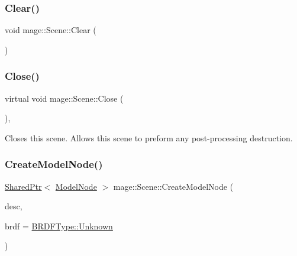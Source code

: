 \hypertarget{classmage_1_1_scene_a916cc7a0867bf1c09e5d10de53192140}{}\label{classmage_1_1_scene_a916cc7a0867bf1c09e5d10de53192140} 
\subsubsection{\texorpdfstring{Clear()}{Clear()}}
{\footnotesize\ttfamily void mage\+::\+Scene\+::\+Clear (\begin{DoxyParamCaption}{ }\end{DoxyParamCaption})\hspace{0.3cm}{\ttfamily [private]}}

\hypertarget{classmage_1_1_scene_a16786d7fcf0b813e2e94061b082cfd1d}{}\label{classmage_1_1_scene_a16786d7fcf0b813e2e94061b082cfd1d} 
\subsubsection{\texorpdfstring{Close()}{Close()}}
{\footnotesize\ttfamily virtual void mage\+::\+Scene\+::\+Close (\begin{DoxyParamCaption}{ }\end{DoxyParamCaption})\hspace{0.3cm}{\ttfamily [private]}, {\ttfamily [virtual]}}

Closes this scene. Allows this scene to preform any post-\/processing destruction. \hypertarget{classmage_1_1_scene_a5928fe1e71e816f6b13d055ee5dfa239}{}\label{classmage_1_1_scene_a5928fe1e71e816f6b13d055ee5dfa239} 
\subsubsection{\texorpdfstring{Create\+Model\+Node()}{CreateModelNode()}\hspace{0.1cm}{\footnotesize\ttfamily [1/2]}}
{\footnotesize\ttfamily \hyperlink{namespacemage_a1e01ae66713838a7a67d30e44c67703e}{Shared\+Ptr}$<$ \hyperlink{classmage_1_1_model_node}{Model\+Node} $>$ mage\+::\+Scene\+::\+Create\+Model\+Node (\begin{DoxyParamCaption}\item[{const \hyperlink{classmage_1_1_model_descriptor}{Model\+Descriptor} \&}]{desc,  }\item[{\hyperlink{namespacemage_ae7a7a03a7b34d7e2689689bb8295cd38}{B\+R\+D\+F\+Type}}]{brdf = {\ttfamily \hyperlink{namespacemage_ae7a7a03a7b34d7e2689689bb8295cd38a88183b946cc5f0e8c96b2e66e1c74a7e}{B\+R\+D\+F\+Type\+::\+Unknown}} }\end{DoxyParamCaption})}

